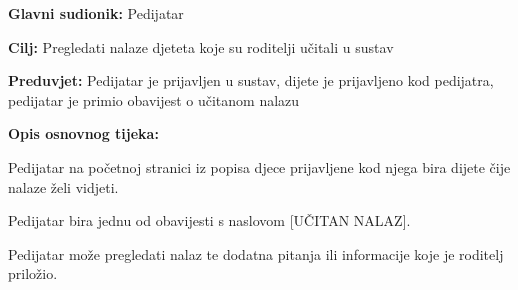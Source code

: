 					\noindent {}
					\begin{packed_item}
						
						\item \textbf{Glavni sudionik: }Pedijatar
						\item  \textbf{Cilj:} Pregledati nalaze djeteta koje su roditelji učitali u sustav
						\item  \textbf{Preduvjet:} Pedijatar je prijavljen u sustav, dijete je prijavljeno kod pedijatra, pedijatar je primio obavijest o učitanom nalazu
						\item  \textbf{Opis osnovnog tijeka:}
						
						\item[] \begin{packed_enum}
							
							\item Pedijatar na početnoj stranici iz popisa djece prijavljene kod njega bira dijete čije nalaze želi vidjeti.
							\item Pedijatar bira jednu od obavijesti s naslovom [UČITAN NALAZ].
							\item Pedijatar može pregledati nalaz te dodatna pitanja ili informacije koje je roditelj priložio.
						\end{packed_enum}
						
						
					\end{packed_item}
					
